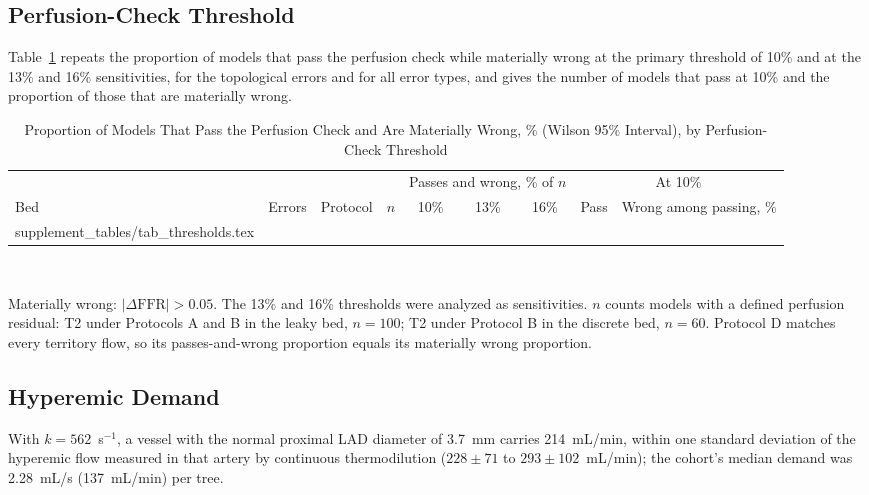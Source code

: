 \documentclass[journal,twoside,web,onecolumn]{ieeecolor}
\begin{document}
\subsection{Perfusion-Check Threshold}
Table~\ref{tab:thr} repeats the proportion of models that pass the perfusion check while materially wrong at the
primary threshold of 10\% and at the 13\% and 16\% sensitivities, for the topological errors and for all error
types, and gives the number of models that pass at 10\% and the proportion of those that are materially wrong.
\begin{table}[!ht]
\caption{Proportion of Models That Pass the Perfusion Check and Are Materially Wrong, \% (Wilson 95\% Interval), by
Perfusion-Check Threshold}\label{tab:thr}
\centering\small
\begin{tabular}{@{}lllrcccrc@{}}
\toprule
 & & & & \multicolumn{3}{c}{Passes and wrong, \% of $n$} & \multicolumn{2}{c}{At 10\%}\\
\cmidrule(lr){5-7}\cmidrule(l){8-9}
Bed & Errors & Protocol & $n$ & 10\% & 13\% & 16\% & Pass & Wrong among passing, \%\\
\midrule
{} supplement_tables/tab_thresholds.tex 
\bottomrule
\end{tabular}
\\[3pt]
\parbox{0.85\textwidth}{\footnotesize Materially wrong: $|\Delta\mathrm{FFR}| > 0.05$. The 13\% and 16\% thresholds were analyzed as sensitivities. $n$ counts models with a
defined perfusion residual: T2 under Protocols A and B in the leaky bed, $n = 100$; T2 under Protocol B in the
discrete bed, $n = 60$. Protocol D matches every territory flow, so its passes-and-wrong proportion equals its
materially wrong proportion.}
\end{table}

\FloatBarrier
\subsection{Hyperemic Demand}\label{sec:demand}
With $k = 562$~s$^{-1}$, a vessel with the normal proximal LAD diameter of 3.7~mm carries 214~mL/min, within one standard deviation of the hyperemic flow measured in that artery by continuous thermodilution ($228 \pm 71$ to $293 \pm 102$~mL/min); the cohort's median demand was 2.28~mL/s (137~mL/min) per tree.


\FloatBarrier
\end{document}
